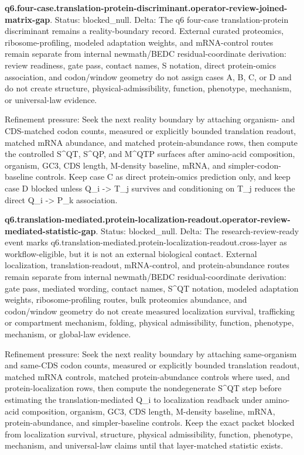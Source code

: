 \textbf{q6.four-case.translation-protein-discriminant.operator-review-joined-matrix-gap}. Status: blocked\_null. Delta: The q6 four-case translation-protein discriminant remains a reality-boundary record. External curated proteomics, ribosome-profiling, modeled adaptation weights, and mRNA-control routes remain separate from internal newmath/BEDC residual-coordinate derivation: review readiness, gate pass, contact names, S notation, direct protein-omics association, and codon/window geometry do not assign cases A, B, C, or D and do not create structure, physical-admissibility, function, phenotype, mechanism, or universal-law evidence.

Refinement pressure: Seek the next reality boundary by attaching organism- and CDS-matched codon counts, measured or explicitly bounded translation readout, matched mRNA abundance, and matched protein-abundance rows, then compute the controlled S\textasciicircum{}QT, S\textasciicircum{}QP, and M\textasciicircum{}QTP surfaces after amino-acid composition, organism, GC3, CDS length, M-density baseline, mRNA, and simpler-codon-baseline controls. Keep case C as direct protein-omics prediction only, and keep case D blocked unless Q\_i -> T\_j survives and conditioning on T\_j reduces the direct Q\_i -> P\_k association.

\textbf{q6.translation-mediated.protein-localization-readout.operator-review-mediated-statistic-gap}. Status: blocked\_null. Delta: The research-review-ready event marks q6.translation-mediated.protein-localization-readout.cross-layer as workflow-eligible, but it is not an external biological contact. External localization, translation-readout, mRNA-control, and protein-abundance routes remain separate from internal newmath/BEDC residual-coordinate derivation: gate pass, mediated wording, contact names, S\textasciicircum{}QT notation, modeled adaptation weights, ribosome-profiling routes, bulk proteomics abundance, and codon/window geometry do not create measured localization survival, trafficking or compartment mechanism, folding, physical admissibility, function, phenotype, mechanism, or global-law evidence.

Refinement pressure: Seek the next reality boundary by attaching same-organism and same-CDS codon counts, measured or explicitly bounded translation readout, matched mRNA controls, matched protein-abundance controls where used, and protein-localization rows, then compute the nondegenerate S\textasciicircum{}QT step before estimating the translation-mediated Q\_i to localization readback under amino-acid composition, organism, GC3, CDS length, M-density baseline, mRNA, protein-abundance, and simpler-baseline controls. Keep the exact packet blocked from localization survival, structure, physical admissibility, function, phenotype, mechanism, and universal-law claims until that layer-matched statistic exists.

